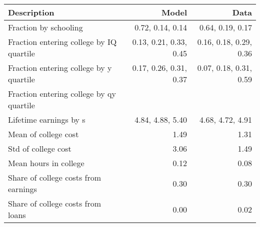 \begin{tabular}{lrr}
\hline
Description & Model  & Data  \\
\hline
Fraction by schooling & 0.72, 0.14, 0.14  & 0.64, 0.19, 0.17  \\
Fraction entering college by IQ quartile & 0.13, 0.21, 0.33, 0.45  & 0.16, 0.18, 0.29, 0.36  \\
Fraction entering college by y quartile & 0.17, 0.26, 0.31, 0.37  & 0.07, 0.18, 0.31, 0.59  \\
Fraction entering college by qy quartile &   &   \\
Lifetime earnings by s & 4.84, 4.88, 5.40  & 4.68, 4.72, 4.91  \\
Mean of college cost & 1.49  & 1.31  \\
Std of college cost & 3.06  & 1.49  \\
Mean hours in college & 0.12  & 0.08  \\
Share of college costs from earnings & 0.30  & 0.30  \\
Share of college costs from loans & 0.00  & 0.02  \\
\hline
\end{tabular}%
